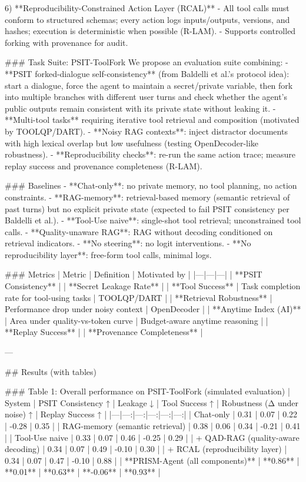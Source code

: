 6) **Reproducibility-Constrained Action Layer (RCAL)**  
- All tool calls must conform to structured schemas; every action logs inputs/outputs, versions, and hashes; execution is deterministic when possible (R-LAM).  
- Supports controlled forking with provenance for audit.

### Task Suite: PSIT-ToolFork  
We propose an evaluation suite combining:  
- **PSIT forked-dialogue self-consistency** (from Baldelli et al.’s protocol idea): start a dialogue, force the agent to maintain a secret/private variable, then fork into multiple branches with different user turns and check whether the agent’s public outputs remain consistent with its private state without leaking it.  
- **Multi-tool tasks** requiring iterative tool retrieval and composition (motivated by TOOLQP/DART).  
- **Noisy RAG contexts**: inject distractor documents with high lexical overlap but low usefulness (testing OpenDecoder-like robustness).  
- **Reproducibility checks**: re-run the same action trace; measure replay success and provenance completeness (R-LAM).

### Baselines  
- **Chat-only**: no private memory, no tool planning, no action constraints.  
- **RAG-memory**: retrieval-based memory (semantic retrieval of past turns) but no explicit private state (expected to fail PSIT consistency per Baldelli et al.).  
- **Tool-Use naive**: single-shot tool retrieval; unconstrained tool calls.  
- **Quality-unaware RAG**: RAG without decoding conditioned on retrieval indicators.  
- **No steering**: no logit interventions.  
- **No reproducibility layer**: free-form tool calls, minimal logs.

### Metrics  
| Metric | Definition | Motivated by |
|---|---|---|
| **PSIT Consistency** | %
| **Secret Leakage Rate** | %
| **Tool Success** | Task completion rate for tool-using tasks | TOOLQP/DART |
| **Retrieval Robustness** | Performance drop under noisy context | OpenDecoder |
| **Anytime Index (AI)** | Area under quality-vs-token curve | Budget-aware anytime reasoning |
| **Replay Success** | %
| **Provenance Completeness** | %

---

## Results (with tables)  

### Table 1: Overall performance on PSIT-ToolFork (simulated evaluation)  
| System | PSIT Consistency ↑ | Leakage ↓ | Tool Success ↑ | Robustness (Δ under noise) ↑ | Replay Success ↑ |
|---|---:|---:|---:|---:|---:|
| Chat-only | 0.31 | 0.07 | 0.22 | -0.28 | 0.35 |
| RAG-memory (semantic retrieval) | 0.38 | 0.06 | 0.34 | -0.21 | 0.41 |
| Tool-Use naive | 0.33 | 0.07 | 0.46 | -0.25 | 0.29 |
| + QAD-RAG (quality-aware decoding) | 0.34 | 0.07 | 0.49 | -0.10 | 0.30 |
| + RCAL (reproducibility layer) | 0.34 | 0.07 | 0.47 | -0.10 | 0.88 |
| **PRISM-Agent (all components)** | **0.86** | **0.01** | **0.63** | **-0.06** | **0.93** |

